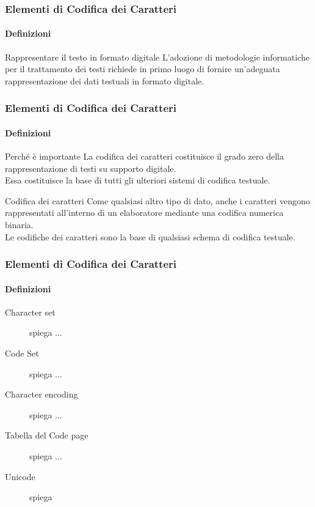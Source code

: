 
\begin{frame}
	\frametitle{Elementi di Codifica dei Caratteri}
	\framesubtitle{Definizioni}
	\addtocounter{nframe}{1}

	\begin{block}{Rappresentare il testo in formato digitale}
		L’adozione di metodologie informatiche per il trattamento dei testi richiede in primo luogo di fornire un'adeguata  rappresentazione dei dati testuali in formato digitale.
	\end{block}

\end{frame}

\begin{frame}
	\frametitle{Elementi di Codifica dei Caratteri}
	\framesubtitle{Definizioni}
	\addtocounter{nframe}{1}

	\begin{block}{Perché è importante}
		La codifica dei caratteri costituisce il grado zero della rappresentazione di testi su supporto digitale.
		\\ Essa costituisce la base di tutti gli ulteriori sistemi di codifica testuale.
	\end{block}



	\begin{block}{Codifica dei caratteri}
		Come qualsiasi altro tipo di dato, anche i caratteri vengono rappresentati all’interno di un elaboratore mediante una codifica numerica binaria.
		\\Le codifiche dei caratteri sono la base di qualsiasi schema di codifica testuale.
	\end{block}

\end{frame}

\begin{frame}
	\frametitle{Elementi di Codifica dei Caratteri}
	\framesubtitle{Definizioni}
	\addtocounter{nframe}{1}


	\begin{description}
		\item [Character set] spiega ...
		\item [Code Set] spiega ...
		\item [Character encoding] spiega ...
		\item [Tabella del Code page] spiega ...
		\item [Unicode] spiega
	\end{description}

\end{frame}

